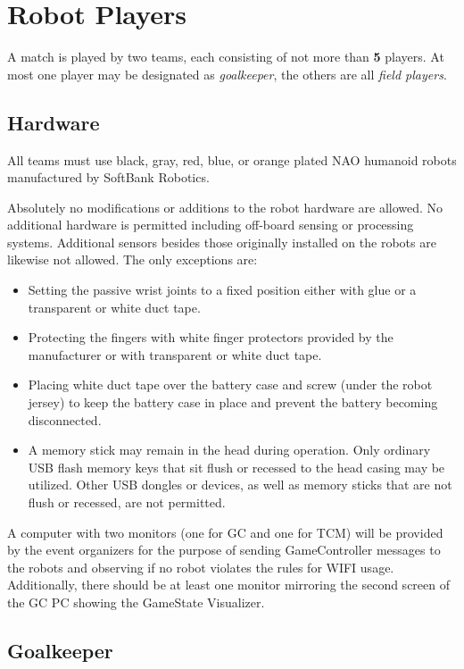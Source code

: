 \section{Robot Players}
\label{sec:robot_players}
A match is played by two teams, each consisting of not more than \textbf{5} players. At most one player may be designated as \emph{goalkeeper}, the others are all \emph{field players}.

\subsection{Hardware}
\label{sec:hardware}
All teams must use black, gray, red, blue, or orange plated NAO humanoid robots manufactured by SoftBank Robotics.

Absolutely no modifications or additions to the robot hardware are allowed. No additional hardware is permitted including off-board sensing or processing systems. Additional sensors besides those originally installed on the robots are likewise not allowed. The only exceptions are:

\begin{itemize}
    \item Setting the passive wrist joints to a fixed position either with glue or a transparent or white duct tape.
    \item Protecting the fingers with white finger protectors provided by the manufacturer or with transparent or white duct tape.
    \item Placing white duct tape over the battery case and screw (under the robot jersey) to keep the battery case in place and prevent the battery becoming disconnected.
    \item A memory stick may remain in the head during operation.  Only ordinary USB flash memory keys that sit flush or recessed to the head casing may be utilized. Other USB dongles or devices, as well as memory sticks that are not flush or recessed, are not permitted.
\end{itemize}

A computer with two monitors (one for GC and one for TCM) will be provided by the event organizers for the purpose of sending GameController messages to the robots and observing if no robot violates the rules for WIFI usage.
Additionally, there should be at least one monitor mirroring the second screen of the GC PC showing the GameState Visualizer. 

\subsection{Goalkeeper}
\label{sec:goalkeeper}

